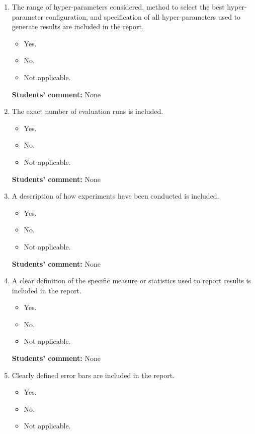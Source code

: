 \documentclass[10pt]{article}
\begin{document}
\begin{enumerate}
    \item The range of hyper-parameters considered, method to select the best hyper-parameter
configuration, and specification of all hyper-parameters used to generate results are included in the report.
    \begin{itemize}
        \item [\faCheckSquareO] Yes.
        \item [\faSquareO] No.
        \item [\faSquareO] Not applicable.
    \end{itemize}
    
    \textbf{Students' comment:} None
    
    \item The exact number of evaluation runs is included.
    \begin{itemize}
        \item [\faCheckSquareO] Yes.
        \item [\faSquareO] No.
        \item [\faSquareO] Not applicable.
    \end{itemize}
    
    \textbf{Students' comment:} None
    
    \item A description of how experiments have been conducted is included.
    \begin{itemize}
        \item [\faCheckSquareO] Yes.
        \item [\faSquareO] No.
        \item [\faSquareO] Not applicable.
    \end{itemize}
    
    \textbf{Students' comment:} None
    
    \item A clear definition of the specific measure or statistics used to report results is included in the report.
    \begin{itemize}
        \item [\faCheckSquareO] Yes.
        \item [\faSquareO] No.
        \item [\faSquareO] Not applicable.
    \end{itemize}
    
    \textbf{Students' comment:} None
    
    \item Clearly defined error bars are included in the report.
    \begin{itemize}
        \item [\faCheckSquareO] Yes.
        \item [\faSquareO] No.
        \item [\faSquareO] Not applicable.
    \end{itemize}
    

\end{enumerate}
\end{document}
